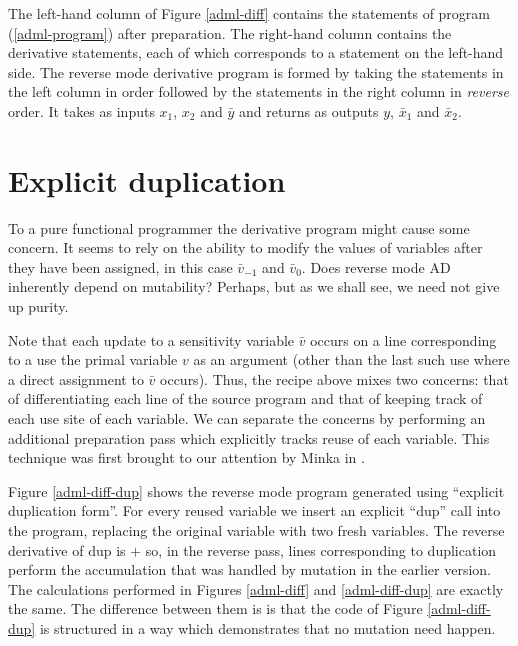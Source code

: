 \documentclass[12pt]{article}
\newcommand{\dup}{\mathrm{dup}}
\begin{document}
The left-hand column of Figure \ref{adml-diff} contains the statements
of program (\ref{adml-program}) after preparation.  The right-hand
column contains the derivative statements, each of which corresponds
to a statement on the left-hand side.  The reverse mode derivative
program is formed by taking the statements in the left column in order
followed by the statements in the right column in \emph{reverse}
order.  It takes as inputs $x_1$, $x_2$ and $\bar{y}$ and returns as
outputs $y$, $\bar{x}_1$ and $\bar{x}_2$.

\section{Explicit duplication}

To a pure functional programmer the derivative program might cause
some concern.  It seems to rely on the ability to modify the values of
variables after they have been assigned, in this case \(\bar{v}_{-1}\)
and \(\bar{v}_0\).  Does reverse mode AD inherently depend on
mutability?  Perhaps, but as we shall see, we need not give up purity.

Note that each update to a sensitivity variable $\bar{v}$ occurs on a
line corresponding to a use the primal variable $v$ as an argument
(other than the last such use where a direct assignment to $\bar{v}$
occurs). Thus, the recipe above mixes two concerns: that of
differentiating each line of the source program and that of keeping
track of each use site of each variable.  We can separate the concerns
by performing an additional preparation pass which explicitly tracks
reuse of each variable.  This technique was first brought to our
attention by Minka in \cite{minka}.

Figure \ref{adml-diff-dup} shows the reverse mode program generated
using ``explicit duplication form''. For every reused variable we
insert an explicit ``$\dup$'' call into the program, replacing the
original variable with two fresh variables.  The reverse derivative of
$\dup$ is $+$ so, in the reverse pass, lines corresponding to
duplication perform the accumulation that was handled by mutation in
the earlier version.  The calculations performed in Figures
\ref{adml-diff} and \ref{adml-diff-dup} are exactly the same.  The
difference between them is is that the code of Figure
\ref{adml-diff-dup} is structured in a way which demonstrates that no
mutation need happen.
\end{document}
